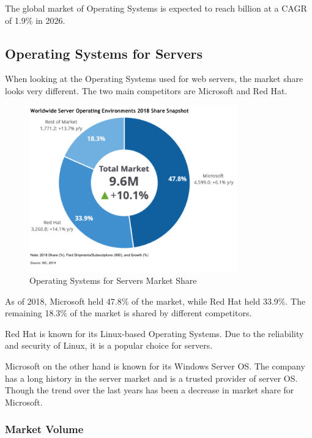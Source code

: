 The global market of Operating Systems is expected to reach  billion at a CAGR of 1.9\% in 2026.
\cite{OsMarketShare3}

\subsection{Operating Systems for Servers}

When looking at the Operating Systems used for web servers, the market share looks very different.
The two main competitors are Microsoft and Red Hat. 

\begin{figure}[H]
    \centering
    \includegraphics[width=0.8\textwidth]{figures/server-operating-system-market-share-2018.png}
    \caption{Operating Systems for Servers Market Share}
    \label{fig:Operating_Systems_for_Servers_Market_Share}
\end{figure}

As of 2018, Microsoft held 47.8\% of the market, while Red Hat held 33.9\%. 
The remaining 18.3\% of the market is shared by different competitors.   

Red Hat is known for its Linux-based Operating Systems. Due to the reliability and security of Linux, it is a popular choice for servers.

Microsoft on the other hand is known for its Windows Server OS. The company has a long history in the server market and is a trusted provider of server OS.
Though the trend over the last years has been a decrease in market share for Microsoft.

\cite{ServerOsMarketShare}

\subsubsection{Market Volume}

